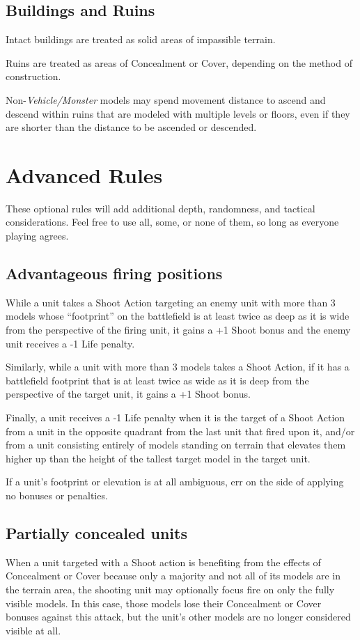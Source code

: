 \begin{multicols}{2}
\section*{Buildings and Ruins}
Intact buildings are treated as solid areas of impassible terrain.

Ruins are treated as areas of Concealment or Cover, depending on the method of construction.

Non-\textit{Vehicle/Monster} models may spend movement distance to ascend and descend within ruins that are modeled with multiple levels or floors, even if they are shorter than the distance to be ascended or descended.





\chapter{Advanced Rules}
These optional rules will add additional depth, randomness, and tactical considerations. Feel free to use all, some, or none of them, so long as everyone playing agrees.




\section*{Advantageous firing positions}
While a unit takes a Shoot Action targeting an enemy unit with more than 3 models whose ``footprint'' on the battlefield is at least twice as deep as it is wide from the perspective of the firing unit, it gains a +1 Shoot bonus and the enemy unit receives a -1 Life penalty.

Similarly, while a unit with more than 3 models takes a Shoot Action, if it has a battlefield footprint that is at least twice as wide as it is deep from the perspective of the target unit, it gains a +1 Shoot bonus.

Finally, a unit receives a -1 Life penalty when it is the target of a Shoot Action from a unit in the opposite quadrant from the last unit that fired upon it, and/or from a unit consisting entirely of models standing on terrain that elevates them higher up than the height of the tallest target model in the target unit.

If a unit's footprint or elevation is at all ambiguous, err on the side of applying no bonuses or penalties.

\section*{Partially concealed units}
When a unit targeted with a Shoot action is benefiting from the effects of Concealment or Cover because only a majority and not all of its models are in the terrain area, the shooting unit may optionally focus fire on only the fully visible models. In this case, those models lose their Concealment or Cover bonuses against this attack, but the unit's other models are no longer considered visible at all.





\end{multicols}
